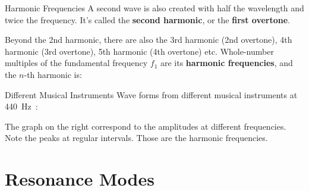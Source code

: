 \documentclass[12pt,compress,aspectratio=169]{beamer}
\begin{document}
\begin{frame}[t]{Harmonic Frequencies}
  A second wave is also created with half the wavelength and twice the
  frequency. It's called the \textbf{second harmonic}, or the
  \textbf{first overtone}.
  \begin{center}
    \hspace{.15in}
    \hspace{.15in}
  \end{center}
  Beyond the 2nd harmonic, there are also the 3rd harmonic (2nd overtone),
  4th harmonic (3rd overtone), 5th harmonic (4th overtone) etc. Whole-number
  multiples of the fundamental frequency $f_1$ are its \textbf{harmonic
    frequencies}, and the $n$-th harmonic is:

\end{frame}



\begin{frame}{Different Musical Instruments}
  Wave forms from different musical instruments at \SI{440}\hertz:
  \begin{center}
  \end{center}
  The graph on the right correspond to the amplitudes at different frequencies.
  Note the peaks at regular intervals. Those are the harmonic frequencies.
\end{frame}



\section{Resonance Modes}
\end{document}

